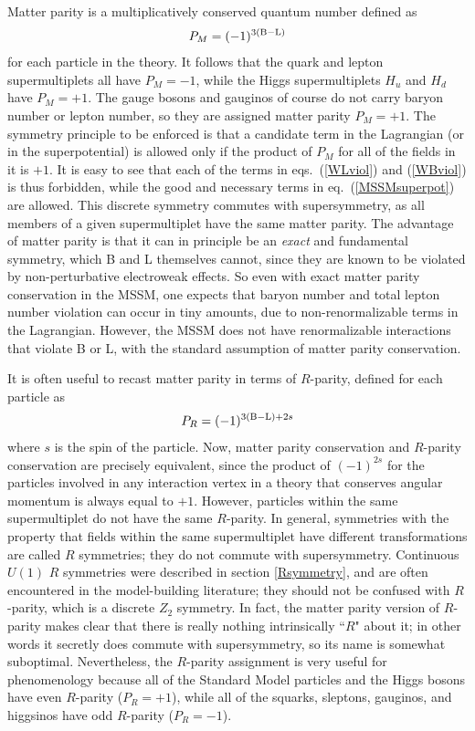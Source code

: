 \documentclass[12pt]{article}
\def\beq{\begin{eqnarray}}
\def\eeq{\end{eqnarray}}
\def\Baryon{{\rm B}}
\def\Lepton{{\rm L}}
\begin{document}
Matter parity is a multiplicatively conserved quantum number defined as
\beq
P_M = (-1)^{3 (\Baryon-\Lepton)}
\label{defmatterparity}
\eeq
for each particle in the theory. It follows that the quark and
lepton supermultiplets all have $P_M=-1$, while the Higgs supermultiplets
$H_u$ and $H_d$ have $P_M=+1$. The gauge bosons and gauginos of course do
not carry baryon number or lepton number, so they are assigned matter
parity $P_M=+1$. The symmetry principle to be enforced is that a candidate
term in the Lagrangian (or in the superpotential) is allowed only if the
product of $P_M$ for all of the fields in it is $+1$. It is easy to see
that each of the terms in eqs.~(\ref{WLviol}) and (\ref{WBviol}) is thus
forbidden, while the good and necessary terms in eq.~(\ref{MSSMsuperpot})
are allowed. This discrete symmetry commutes with supersymmetry, as all
members of a given supermultiplet have the same matter parity. The
advantage of matter parity is that it can in principle be an {\it exact}
and fundamental symmetry, which B and L themselves cannot, since they are
known to be violated by non-perturbative electroweak effects. So even with
exact matter parity conservation in the MSSM, one expects that baryon
number and total lepton number violation can occur in tiny amounts, due to
non-renormalizable terms in the Lagrangian. However, the MSSM does not have
renormalizable interactions that violate B or L, with the standard
assumption of matter parity conservation.

It is often useful to recast matter parity in terms of $R$-parity,
defined for each particle as
\beq
P_R = (-1)^{3(\Baryon-\Lepton) + 2 s}
\label{defRparity}
\eeq
where $s$ is the spin of the particle. Now, matter parity conservation and
$R$-parity conservation are precisely equivalent, since the product of
$(-1)^{2s}$ for the particles involved in any interaction vertex in a
theory that conserves angular momentum is always equal to $+1$. However,
particles within the same supermultiplet do not have the same $R$-parity.
In general, symmetries with the property that fields within the same
supermultiplet have different transformations are called $R$ symmetries;  
they do not commute with supersymmetry.  Continuous $U(1)$ $R$ symmetries
were described in section \ref{Rsymmetry}, and
are often encountered in the model-building literature; they should not be
confused with $R$-parity, which is a discrete $Z_2$ symmetry. In fact, the
matter parity version of $R$-parity makes clear that there is really
nothing intrinsically ``$R$" about it; in other words it secretly does
commute with supersymmetry, so its name is somewhat suboptimal.
Nevertheless, the $R$-parity assignment is very useful for phenomenology
because all of the Standard Model particles and the Higgs bosons have even
$R$-parity ($P_R=+1$), while all of the squarks, sleptons, gauginos, and
higgsinos have odd $R$-parity ($P_R=-1$).
\end{document}
